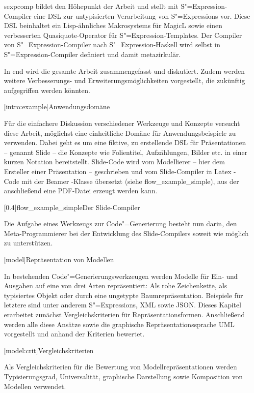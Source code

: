 \documentclass[11pt, a4paper, bibgerm]{scrbook}
\newcommand\lchapter{}
\newcommand\lsection{}
\newcommand\cref{}
\newcommand\abb{}
\newcommand\fig{}
\newcommand{\seea}[1]{(siehe \abb{#1})}
\newcommand{\sexp}{S"=Expression}
\newcommand{\sexps}{S"=Expressions}
\newcommand{\cgen}{Code"=Generierung}
\begin{document}
\cref{sexpcomp} bildet den Höhepunkt der Arbeit und stellt mit
\sexp{}-Compiler eine DSL zur untypisierten Verarbeitung von \sexps{}
vor. Diese DSL beinhaltet ein Lisp-ähnliches Makrosystems für MagicL
sowie einen verbesserten Quasiquote-Operator für \sexp{}-Templates. Der
Compiler von \sexp{}-Compiler nach \sexp{}-Haskell wird selbst in
\sexp{}-Compiler definiert und damit metazirkulär.

In \cref{end} wird die gesamte Arbeit zusammengefasst und
diskutiert. Zudem werden weitere Verbesserungs- und
Erweiterungsmöglichkeiten vorgestellt, die zukünftig aufgegriffen werden
könnten.

\lsection[intro:example]{Anwendungsdomäne}

Für die einfachere Diskussion verschiedener Werkzeuge und Konzepte
versucht diese Arbeit, möglichst eine einheitliche Domäne für
Anwendungsbeispiele zu verwenden. Dabei geht es um eine fiktive, zu
erstellende DSL für Präsentationen -- genannt Slide -- die Konzepte wie
Folientitel, Aufzählungen, Bilder etc. in einer kurzen
Notation bereitstellt. Slide-Code wird vom Modellierer -- hier dem
Ersteller einer Präsentation -- geschrieben und vom Slide-Compiler in
Latex \cite{Latex}-Code mit der Beamer \cite{LatexBeamer}-Klasse übersetzt
\seea{flow_example_simple}, aus der anschließend eine PDF-Datei erzeugt
werden kann.

\fig[0.4]{flow_example_simple}{Der Slide-Compiler} 

Die Aufgabe eines Werkzeugs zur \cgen{} besteht nun darin, den
Meta-Programmierer bei der Entwicklung des Slide-Compilers soweit wie
möglich zu unterstützen.

\lchapter[model]{Repräsentation von Modellen}

In bestehenden \cgen{}swerkzeugen werden Modelle für Ein- und Ausgaben
auf eine von drei Arten repräsentiert: Als rohe Zeichenkette, als
typisiertes Objekt oder durch eine ungetypte
Baumrepräsentation. Beispiele für letztere sind unter anderem \sexps{},
XML sowie JSON. Dieses Kapitel erarbeitet zunächst Vergleichskriterien
für Repräsentationsformen. Anschließend werden alle diese Ansätze sowie
die graphische Repräsentationssprache UML vorgestellt und anhand der
Kriterien bewertet.

\lsection[model:crit]{Vergleichskriterien}

Als Vergleichskriterien für die Bewertung von
Modellrepräsentationen werden Typisierungsgrad, Universalität,
graphische Darstellung sowie Komposition von Modellen verwendet.
\end{document}
